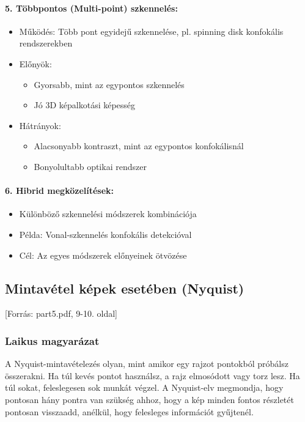 \documentclass[a4paper,12pt]{article}
\begin{document}
\paragraph{5. Többpontos (Multi-point) szkennelés:} \begin{itemize} \item Működés: Több pont egyidejű szkennelése, pl. spinning disk konfokális rendszerekben \item Előnyök: \begin{itemize} \item Gyorsabb, mint az egypontos szkennelés \item Jó 3D képalkotási képesség \end{itemize} \item Hátrányok: \begin{itemize} \item Alacsonyabb kontraszt, mint az egypontos konfokálisnál \item Bonyolultabb optikai rendszer \end{itemize} \end{itemize}

\paragraph{6. Hibrid megközelítések:} \begin{itemize} \item Különböző szkennelési módszerek kombinációja \item Példa: Vonal-szkennelés konfokális detekcióval \item Cél: Az egyes módszerek előnyeinek ötvözése \end{itemize}

\subsection{Mintavétel képek esetében (Nyquist)} [Forrás: part5.pdf, 9-10. oldal]

\subsubsection{Laikus magyarázat} A Nyquist-mintavételezés olyan, mint amikor egy rajzot pontokból próbálsz összerakni. Ha túl kevés pontot használsz, a rajz elmosódott vagy torz lesz. Ha túl sokat, feleslegesen sok munkát végzel. A Nyquist-elv megmondja, hogy pontosan hány pontra van szükség ahhoz, hogy a kép minden fontos részletét pontosan visszaadd, anélkül, hogy felesleges információt gyűjtenél.
\end{document}
